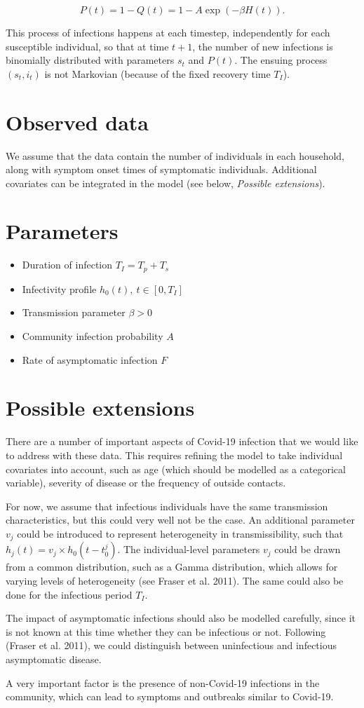 \documentclass[a4paper]{article}
\begin{document}
\[
	P(t)=1-Q(t) = 1-A\exp(-\beta H(t)).
\]

This process of infections happens at each timestep, independently for each
susceptible individual, so that at time \(t+1\), the number of new infections is
binomially distributed with parameters \(s_t\) and \(P(t)\). The ensuing process
\((s_t,i_t)\) is not Markovian (because of the fixed recovery time \(T_I\)).

\section*{Observed data}

We assume that the data contain the number of individuals in each household,
along with symptom onset times of symptomatic individuals. Additional covariates
can be integrated in the model (see below, \emph{Possible extensions}).

\section*{Parameters}

\begin{itemize}
\item Duration of infection \(T_I=T_p+T_s\)
\item Infectivity profile \(h_0(t),\ t\in [0,T_I]\)
\item Transmission parameter \(\beta >0\)
\item Community infection probability \(A\)
\item Rate of asymptomatic infection \(F\)
\end{itemize}

\section*{Possible extensions}

There are a number of important aspects of Covid-19 infection that we would like
to address with these data. This requires refining the model to take individual
covariates into account, such as age (which should be modelled as a categorical
variable), severity of disease or the frequency of outside contacts. 

For now, we assume that infectious individuals have the same transmission
characteristics, but this could very well not be the case. An additional
parameter \(v_j\) could be introduced to represent heterogeneity in
transmissibility, such that \(h_j(t) = v_j\times h_0(t-t_0^j)\). The
individual-level parameters  \(v_j\) could be drawn from a common distribution,
such as a Gamma distribution, which allows for varying levels of heterogeneity 
(see Fraser et al. 2011). The same could also be done for the infectious period 
\(T_I\). 

The impact of asymptomatic infections should also be modelled carefully, since
it is not known at this time whether they can be infectious or not. Following 
(Fraser et al. 2011), we could distinguish between uninfectious and infectious
asymptomatic disease.

A very important factor is the presence of non-Covid-19 infections in the
community, which can lead to symptoms and outbreaks similar to Covid-19. 
\end{document}
